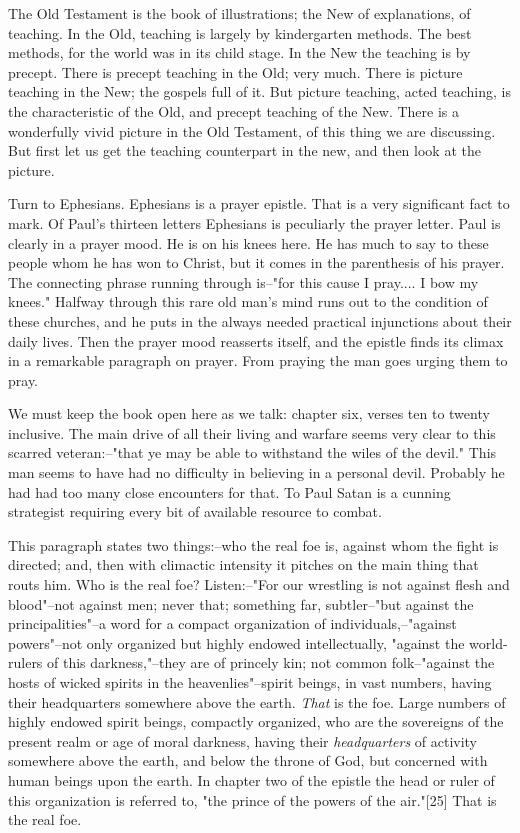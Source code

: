 The Old Testament is the book of illustrations; the New of explanations,
of teaching. In the Old, teaching is largely by kindergarten methods. The
best methods, for the world was in its child stage. In the New the
teaching is by precept. There is precept teaching in the Old; very much.
There is picture teaching in the New; the gospels full of it. But picture
teaching, acted teaching, is the characteristic of the Old, and precept
teaching of the New. There is a wonderfully vivid picture in the Old
Testament, of this thing we are discussing. But first let us get the
teaching counterpart in the new, and then look at the picture.

Turn to Ephesians. Ephesians is a prayer epistle. That is a very
significant fact to mark. Of Paul's thirteen letters Ephesians is
peculiarly the prayer letter. Paul is clearly in a prayer mood. He is on
his knees here. He has much to say to these people whom he has won to
Christ, but it comes in the parenthesis of his prayer. The connecting
phrase running through is--"for this cause I pray.... I bow my knees."
Halfway through this rare old man's mind runs out to the condition of
these churches, and he puts in the always needed practical injunctions
about their daily lives. Then the prayer mood reasserts itself, and the
epistle finds its climax in a remarkable paragraph on prayer. From praying
the man goes urging them to pray.

We must keep the book open here as we talk: chapter six, verses ten to
twenty inclusive. The main drive of all their living and warfare seems
very clear to this scarred veteran:--"that ye may be able to withstand the
wiles of the devil." This man seems to have had no difficulty in believing
in a personal devil. Probably he had had too many close encounters for
that. To Paul Satan is a cunning strategist requiring every bit of
available resource to combat.

This paragraph states two things:--who the real foe is, against whom the
fight is directed; and, then with climactic intensity it pitches on the
main thing that routs him. Who is the real foe? Listen:--"For our
wrestling is not against flesh and blood"--not against men; never that;
something far, subtler--"but against the principalities"--a word for a
compact organization of individuals,--"against powers"--not only organized
but highly endowed intellectually, "against the world-rulers of this
darkness,"--they are of princely kin; not common folk--"against the hosts
of wicked spirits in the heavenlies"--spirit beings, in vast numbers,
having their headquarters somewhere above the earth. \textit{That} is the foe.
Large numbers of highly endowed spirit beings, compactly organized, who
are the sovereigns of the present realm or age of moral darkness, having
their \textit{headquarters} of activity somewhere above the earth, and below the
throne of God, but concerned with human beings upon the earth. In chapter
two of the epistle the head or ruler of this organization is referred to,
"the prince of the powers of the air."[25] That is the real foe.

